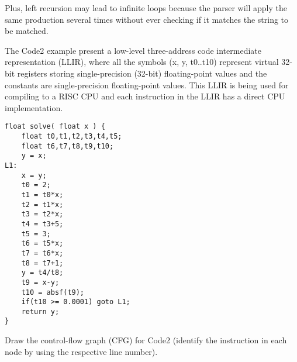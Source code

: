 \documentclass[docid=2021]{comp_exam_round1}
\begin{document}
Plus, left recursion may lead to infinite loops because the parser will apply the same production several times without ever checking if it matches the string to be matched.

\newpage

\examgroup{}

The Code2 example present a low-level three-address code intermediate representation (LLIR), where all the symbols (x, y, t0..t10) represent virtual 32-bit registers storing single-precision (32-bit) floating-point values and the constants are single-precision floating-point values. This LLIR is being used for compiling to a RISC CPU and each instruction in the LLIR has a direct CPU implementation.

\begin{lstlisting}[caption=Code2]
float solve( float x ) {
    float t0,t1,t2,t3,t4,t5;
    float t6,t7,t8,t9,t10;
    y = x;
L1:
    x = y;
    t0 = 2;
    t1 = t0*x;
    t2 = t1*x;
    t3 = t2*x;
    t4 = t3+5;
    t5 = 3;
    t6 = t5*x;
    t7 = t6*x;
    t8 = t7+1;
    y = t4/t8;
    t9 = x-y;
    t10 = absf(t9);
    if(t10 >= 0.0001) goto L1;
    return y;
}
\end{lstlisting}

\question
Draw the control-flow graph (CFG) for Code2 (identify the instruction in each node by using the respective line number).

\ansseparator

\begin{center}
    \small
\end{center}
\end{document}
